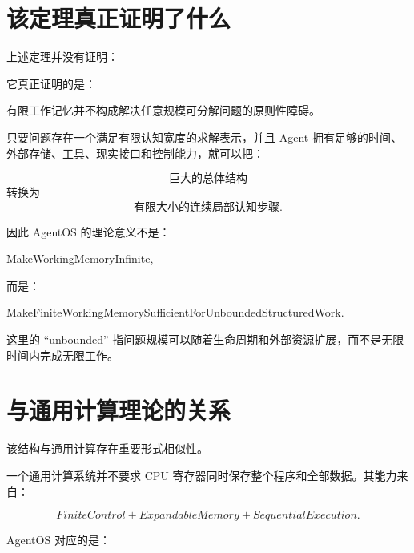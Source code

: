 \section{该定理真正证明了什么}

上述定理并没有证明：

\begin{statementbox}
\centering
{}
\end{statementbox}

它真正证明的是：

\begin{statementbox}
有限工作记忆并不构成解决任意规模可分解问题的原则性障碍。
\end{statementbox}

只要问题存在一个满足有限认知宽度的求解表示，并且 Agent 拥有足够的时间、外部存储、工具、现实接口和控制能力，就可以把：

\begin{equation}
\text{巨大的总体结构}
\end{equation}
转换为
\begin{equation}
\text{有限大小的连续局部认知步骤}.
\end{equation}

因此 AgentOS 的理论意义不是：

\begin{statementbox}
MakeWorkingMemoryInfinite,
\end{statementbox}
而是：

\begin{statementbox}
MakeFiniteWorkingMemorySufficientForUnboundedStructuredWork.
\end{statementbox}

这里的 ``unbounded'' 指问题规模可以随着生命周期和外部资源扩展，而不是无限时间内完成无限工作。

\section{与通用计算理论的关系}

该结构与通用计算存在重要形式相似性。

一个通用计算系统并不要求 CPU 寄存器同时保存整个程序和全部数据。其能力来自：

\begin{equation}
FiniteControl
+
ExpandableMemory
+
SequentialExecution.
\end{equation}

AgentOS 对应的是：

